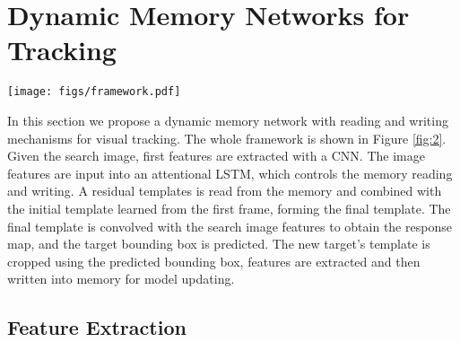 \documentclass[runningheads]{llncs}
\begin{document}
\section{Dynamic Memory Networks for Tracking}

\begin{figure*}[t]
	\begin{center}
		\texttt{[image: figs/framework.pdf]}
	\end{center}
	\caption{The pipeline of our tracking algorithm. The green rectangle are the candidate region for target searching. The \textit{Feature Extractions} for object image and search image share the same architecture and parameters. An attentional LSTM extracts the target's information on the search feature map, which guides the memory reading process to retrieve a matching template.  The residual  template is combined with the initial template, to obtain a final template for generating the response score. The newly predicted bounding box is then used to crop the object's image patch for memory writing. 
	}
	\label{fig:2}
\end{figure*}

In this section we propose a dynamic memory network with reading and writing mechanisms for visual tracking. 
The whole framework is shown in Figure \ref{fig:2}.
Given the search image, first features are extracted with a CNN.
The image features are input into an attentional LSTM, which controls the memory reading and writing. 
A residual templates is read from the memory and combined with the initial template learned from the first frame, forming the final template.  The final template is convolved with the search image features to obtain the response map, and the target bounding box is predicted.
The new target's template is cropped using the predicted bounding box, features are extracted and then written into memory for model updating. 

\subsection{Feature Extraction}
\end{document}
